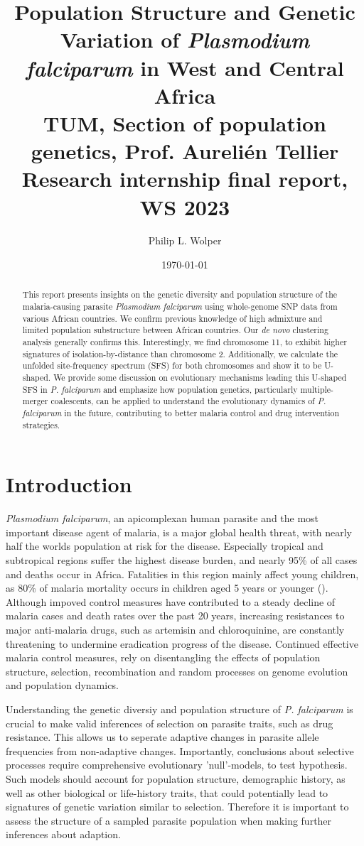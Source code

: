 \documentclass[11pt]{article}
\author{Philip L. Wolper}
\date{\today}
\title{Population Structure and Genetic Variation of \emph{Plasmodium falciparum} in West and Central Africa\\\medskip
\large TUM, Section of population genetics, Prof. Aureli\'{e}n Tellier \linebreak Research internship final report, WS 2023}
\begin{document}
\maketitle
\begin{abstract}
This report presents insights on the genetic diversity and population structure of the malaria-causing parasite \emph{Plasmodium falciparum} using whole-genome SNP data from various African countries. We confirm previous knowledge of high admixture and limited population substructure between African countries. Our \emph{de novo} clustering analysis generally confirms this. Interestingly, we find chromosome 11, to exhibit higher signatures of isolation-by-distance than chromosome 2. Additionally, we calculate the unfolded site-frequency spectrum (SFS) for both chromosomes and show it to be U-shaped. We provide some discussion on evolutionary mechanisms leading this U-shaped SFS in \emph{P. falciparum} and emphasize how population genetics, particularly multiple-merger coalescents, can be applied to understand the evolutionary dynamics of \emph{P. falciparum} in the future, contributing to better malaria control and drug intervention strategies.
\end{abstract}

\section*{Introduction}
\label{sec:org0e8bf3c}
\emph{Plasmodium falciparum}, an apicomplexan human parasite and the most important disease agent of malaria, is a major global health threat, with nearly half the worlds population at risk for the disease. Especially tropical and subtropical regions suffer the highest disease burden, and nearly 95\% of all cases and deaths occur in Africa. Fatalities in this region mainly affect young children, as 80\% of malaria mortality occurs in children aged 5 years or younger (\cite{world2022world}). Although impoved control measures have contributed to a steady decline of malaria cases and death rates over the past 20 years, increasing resistances to major anti-malaria drugs, such as artemisin and chloroquinine, are constantly threatening to undermine eradication progress of the disease. Continued effective malaria control measures, rely on disentangling the effects of population structure, selection, recombination and random processes on genome evolution and population dynamics.

Understanding the genetic diversiy and population structure of \emph{P. falciparum} is crucial to make valid inferences of selection on parasite traits, such as drug resistance. This allows us to seperate adaptive changes in parasite allele frequencies from non-adaptive changes. Importantly, conclusions about selective processes require comprehensive evolutionary 'null'-models, to test hypothesis. Such models should account for population structure, demographic history, as well as other biological or life-history traits, that could potentially lead to signatures of genetic variation similar to selection. Therefore it is important to assess the structure of a sampled parasite population when making further inferences about adaption.
\end{document}
